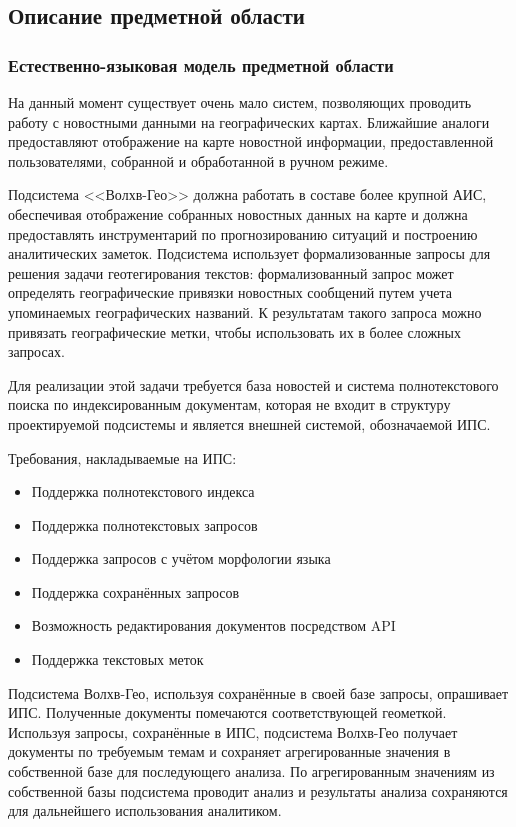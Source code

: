 \subsection{Описание предметной области}
\subsubsection{Естественно-языковая модель предметной области}

На данный момент существует очень мало систем, позволяющих проводить работу с новостными данными на географических картах. Ближайшие аналоги предоставляют отображение на карте новостной информации, предоставленной пользователями, собранной и обработанной в ручном режиме.

Подсистема <<Волхв-Гео>> должна работать в составе более крупной АИС, обеспечивая отображение собранных новостных данных на карте и должна предоставлять инструментарий по прогнозированию ситуаций и построению аналитических заметок. Подсистема использует формализованные запросы для решения задачи геотегирования текстов: формализованный запрос может определять географические привязки новостных сообщений путем учета упоминаемых географических названий. К результатам такого запроса можно привязать географические метки, чтобы использовать их в более сложных запросах.

Для реализации этой задачи требуется база новостей и система полнотекстового поиска по индексированным документам, которая не входит в структуру проектируемой подсистемы и является внешней системой, обозначаемой ИПС.

Требования, накладываемые на ИПС:
\begin{itemize}
\item Поддержка полнотекстового индекса
\item Поддержка полнотекстовых запросов
\item Поддержка запросов с учётом морфологии языка
\item Поддержка сохранённых запросов
\item Возможность редактирования документов посредством API
\item Поддержка текстовых меток
\end{itemize}

Подсистема Волхв-Гео, используя сохранённые в своей базе запросы, опрашивает ИПС. Полученные документы помечаются соответствующей геометкой. Используя запросы, сохранённые в ИПС, подсистема Волхв-Гео получает документы по требуемым темам и сохраняет агрегированные значения в собственной базе для последующего анализа.
По агрегированным значениям из собственной базы подсистема проводит анализ и результаты анализа сохраняются для дальнейшего использования аналитиком.

